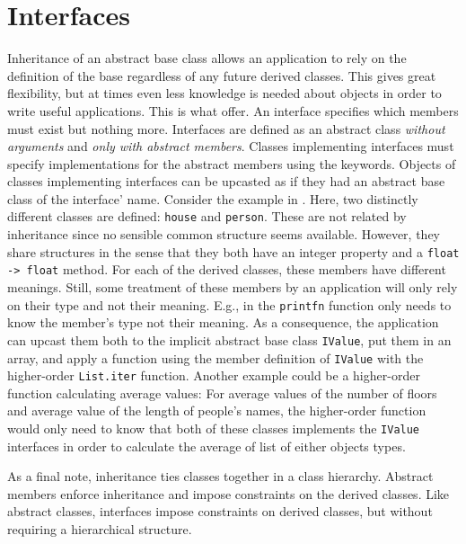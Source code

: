 \section{Interfaces}
\label{sec:interfaces}
Inheritance of an abstract base class allows an application to rely on the definition of the base regardless of any future derived classes. This gives great flexibility, but at times even less knowledge is needed about objects in order to write useful applications. This is what  offer. An interface specifies which members must exist but nothing more. Interfaces are defined as an abstract class \emph{without arguments} and \emph{only with abstract members}. Classes implementing interfaces must specify implementations for the abstract members using the  keywords. Objects of classes implementing interfaces can be upcasted as if they had an abstract base class of the interface' name. Consider the example in .
%
%
Here, two distinctly different classes are defined: \lstinline{house} and \lstinline{person}. These are not related by inheritance since no sensible common structure seems available. However, they share structures in the sense that they both have an integer property and a \lstinline{float -> float} method. For each of the derived classes, these members have different meanings. Still, some treatment of these members by an application will only rely on their type and not their meaning. E.g., in  the \lstinline{printfn} function only needs to know the member's type not their meaning. As a consequence, the application can upcast them both to the implicit abstract base class \lstinline{IValue}, put them in an array, and apply a function using the member definition of \lstinline{IValue} with the higher-order \lstinline{List.iter} function. Another example could be a higher-order function calculating average values: For average values of the number of floors and average value of the length of people's names, the higher-order function would only need to know that both of these classes implements the \lstinline{IValue} interfaces in order to calculate the average of list of either objects types.

As a final note, inheritance ties classes together in a class hierarchy. Abstract members enforce inheritance and impose constraints on the derived classes. Like abstract classes, interfaces impose constraints on derived classes, but without requiring a hierarchical structure.

